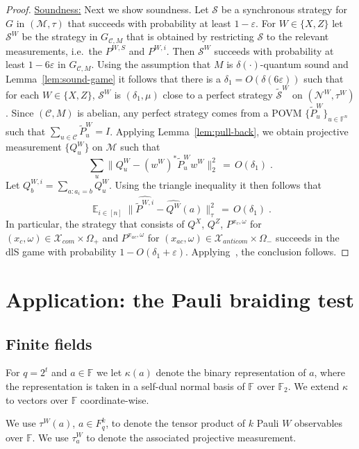 \documentclass[11pt]{article}
\theoremstyle{definition}
\newcommand{\code}{\mathcal{C}}
\newcommand{\strategy}{\mathscr{S}}
\newcommand{\Id}{\ensuremath{I}}
\DeclareMathOperator*{\Expectation}{\mathbb{E}}
\newcommand{\Es}[1]{\Expectation_{#1}}
\newcommand{\field}{\mathbb{F}}
\newcommand{\F}{\ensuremath{\mathbb{F}}}
\newcommand{\mM}{\ensuremath{\mathcal{M}}}
\newcommand{\mX}{\ensuremath{\mathcal{X}}}
\newcommand{\eps}{\varepsilon}
\newcommand{\mN}{\mathcal{N}}
\begin{document}
\begin{proof}
\underline{Soundness:} Next we show soundness. Let $\strategy$ be a synchronous strategy for $G$  in  $(\mM,\tau)$ that succeeds with probability at least $1-\eps$. For $W\in\{X,Z\}$ let $\strategy^W$ be the strategy in $G_{\code,M}$ that is obtained by restricting $\strategy$ to the relevant measurements, i.e.\ the $P^{W,S}$ and $P^{W,i}$.  Then $\strategy^W$ succeeds with probability at least $1-6\eps$ in $G_{\code,M}$. Using the assumption that $M$ is $\delta(\cdot)$-quantum sound and Lemma~\ref{lem:sound-game} it follows that there is a $\delta_1 = O(\delta(6\eps))$ such that for each $W\in\{X,Z\}$, $\strategy^W$ is $(\delta_1,\mu)$ close to a perfect strategy $\tilde{\strategy}^W$ on $(\mN^W,\tau^W)$. Since $(\code,M)$ is abelian, any perfect strategy comes from a POVM $\{\tilde{P}^W_u\}_{u\in \field^n}$ such that $\sum_{u\in \code}\tilde{P}^W_u = \Id$. 
Applying Lemma~\ref{lem:pull-back}, we obtain projective measurement $\{Q^W_u\}$ on $\mM$ such that 
\begin{equation*}
\sum_u \big\|Q^W_u - (w^W)^* \tilde{P}_u^W w^W \big\|^2_2 \,=\, O(\delta_1)\;.
\end{equation*}
Let $Q^{W,i}_b = \sum_{a: a_i=b} Q^W_u$. 
Using the triangle inequality it then follows that
\begin{equation*}
 \Es{i\in [n]}  \big\|\widehat{\tilde{P}^{W,i}} - \widehat{Q^W}(a) \big\|^2_\tau \,=\, O(\delta_1)\;.
\end{equation*}
In particular, the strategy that consists of $Q^X$, $Q^Z$, $P^{x_c,\omega}$ for $(x_c,\omega) \in \mX_{com}\times \Omega_+$ and $P^{x_{ac},\omega}$ for $(x_{ac},\omega)\in \mX_{anticom} \times \Omega_-$ succeeds in the dlS game with probability $1-O(\delta_1+\eps)$. Applying~\cite[Corollary 3.9]{de2022spectral}, the conclusion follows. 
\end{proof}


\section{Application: the Pauli braiding test}

\subsection{Finite fields}

For $q=2^t$ and $a\in \field$ we let $\kappa(a)$ denote the binary representation of $a$, where the representation is taken in a self-dual normal basis of $\field$ over $\F_2$. We extend $\kappa$ to vectors over $\field$ coordinate-wise.
	
	We use $\tau^W(a)$, $a\in F_q^k$, to denote the tensor product of $k$ Pauli $W$ observables over $\field$. We use $\tau^W_a$ to denote the associated projective measurement. 
	



\notesendofpaper
\end{document}
